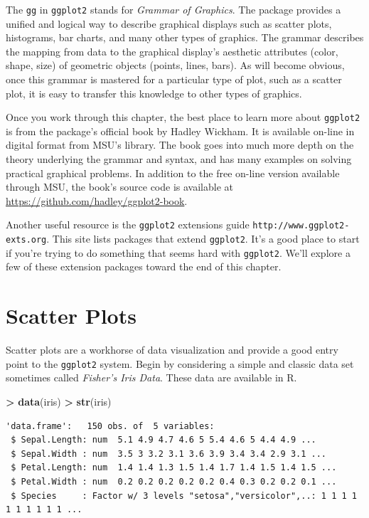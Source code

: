 \documentclass[]{krantz}
\makeatletter
\newenvironment{Shaded}{\begin{snugshade}}{\end{snugshade}}
\newcommand{\KeywordTok}[1]{\textcolor[rgb]{0.27,0.27,0.27}{\textbf{#1}}}
\newcommand{\NormalTok}[1]{#1}
\newcommand{\OperatorTok}[1]{\textcolor[rgb]{0.43,0.43,0.43}{\textbf{#1}}}
\newcommand{\StringTok}[1]{\textcolor[rgb]{0.5,0.5,0.5}{#1}}
\newenvironment{kframe}{%
\medskip{}
\setlength{\fboxsep}{.8em}
 \def\at@end@of@kframe{}%
 \ifinner\ifhmode%
  \def\at@end@of@kframe{\end{minipage}}%
  \begin{minipage}{\columnwidth}%
 \fi\fi%
 \def\FrameCommand##1{\hskip\@totalleftmargin \hskip-\fboxsep
 \colorbox{shadecolor}{##1}\hskip-\fboxsep
     \hskip-\linewidth \hskip-\@totalleftmargin \hskip\columnwidth}%
 \MakeFramed {\advance\hsize-\width
   \@totalleftmargin\z@ \linewidth\hsize
   \@setminipage}}%
 {\par\unskip\endMakeFramed%
 \at@end@of@kframe}
\renewenvironment{Shaded}{\begin{kframe}}{\end{kframe}}
\makeatother
\begin{document}
The \texttt{gg} in \texttt{ggplot2} stands for \emph{Grammar of Graphics}. The package provides a unified and logical way to describe graphical displays such as scatter plots, histograms, bar charts, and many other types of graphics. The grammar describes the mapping from data to the graphical display's aesthetic attributes (color, shape, size) of geometric objects (points, lines, bars). As will become obvious, once this grammar is mastered for a particular type of plot, such as a scatter plot, it is easy to transfer this knowledge to other types of graphics.

Once you work through this chapter, the best place to learn more about \texttt{ggplot2} is from the package's official book \citet{WickhamGgplot2Book} by Hadley Wickham. It is available on-line in digital format from MSU's library. The book goes into much more depth on the theory underlying the grammar and syntax, and has many examples on solving practical graphical problems. In addition to the free on-line version available through MSU, the book's source code is available at \url{https://github.com/hadley/ggplot2-book}.

Another useful resource is the \texttt{ggplot2} extensions guide \texttt{http://www.ggplot2-exts.org}. This site lists packages that extend \texttt{ggplot2}. It's a good place to start if you're trying to do something that seems hard with \texttt{ggplot2}. We'll explore a few of these extension packages toward the end of this chapter.

\hypertarget{scatter-plots}{%
\section{Scatter Plots}\label{scatter-plots}}

Scatter plots are a workhorse of data visualization and provide a good entry point to the \texttt{ggplot2} system. Begin by considering a simple and classic data set sometimes called \emph{Fisher's Iris Data}. These data are available in R.

\begin{Shaded}
\begin{Highlighting}[]
\OperatorTok{>}\StringTok{ }\KeywordTok{data}\NormalTok{(iris)}
\OperatorTok{>}\StringTok{ }\KeywordTok{str}\NormalTok{(iris)}
\end{Highlighting}
\end{Shaded}

\begin{verbatim}
'data.frame':   150 obs. of  5 variables:
 $ Sepal.Length: num  5.1 4.9 4.7 4.6 5 5.4 4.6 5 4.4 4.9 ...
 $ Sepal.Width : num  3.5 3 3.2 3.1 3.6 3.9 3.4 3.4 2.9 3.1 ...
 $ Petal.Length: num  1.4 1.4 1.3 1.5 1.4 1.7 1.4 1.5 1.4 1.5 ...
 $ Petal.Width : num  0.2 0.2 0.2 0.2 0.2 0.4 0.3 0.2 0.2 0.1 ...
 $ Species     : Factor w/ 3 levels "setosa","versicolor",..: 1 1 1 1 1 1 1 1 1 1 ...
\end{verbatim}
\end{document}
